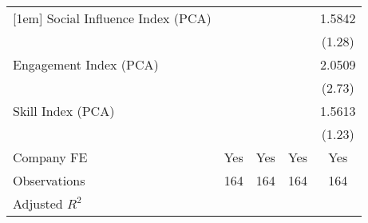 {\begin{tabular}{l*{4}{c}}
[1em]
Social Influence Index (PCA)       &                   &                   &                   &    1.5842         \\
                                   &                   &                   &                   &    (1.28)         \\
[1em]
Engagement Index (PCA)             &                   &                   &                   &    2.0509\sym{***}\\
                                   &                   &                   &                   &    (2.73)         \\
[1em]
Skill Index (PCA)                  &                   &                   &                   &    1.5613         \\
                                   &                   &                   &                   &    (1.23)         \\
[1em]
Company FE                         &       Yes         &       Yes         &       Yes         &       Yes         \\
\hline
Observations                       &       164         &       164         &       164         &       164         \\
Adjusted \(R^{2}\)                 &                   &                   &                   &                   \\
\hline\hline
\end{tabular}
}
